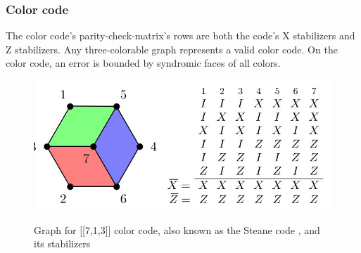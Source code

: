 \subsubsection{Color code}
The color code's parity-check-matrix's 
rows are both the code's X stabilizers and Z stabilizers.
Any three-colorable graph represents a valid color code.
On the color code, an error is bounded by syndromic faces of all colors.
\\
\begin{figure}[h!]
	\begin{center}
	\captionsetup{justification=centering,margin=2cm}
	\includegraphics[scale=0.6]{./img/figures/steane.png}\\
	\caption{Graph for [[7,1,3]] color code, also known as the
    Steane code \cite{steane} , and its stabilizers}
        
	\label{fig: color_graph}
	\end{center}
\end{figure}
